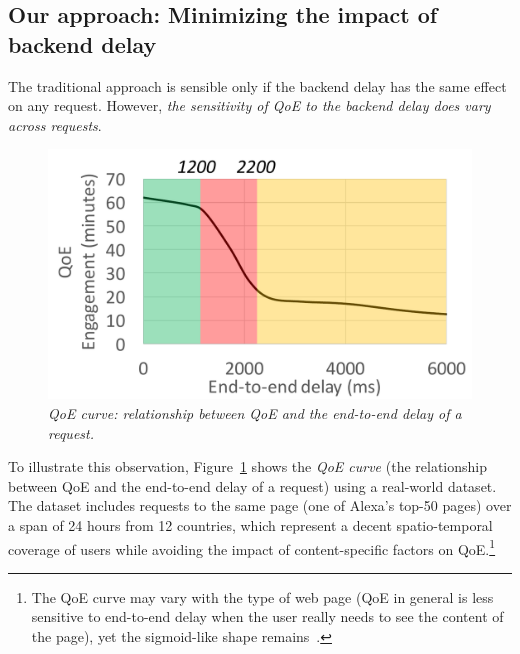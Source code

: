 \subsection{Our approach: Minimizing the impact of backend delay}

The traditional approach is sensible only if the backend delay has the same effect on any request.
However, {\em the sensitivity of QoE to the backend delay does vary across requests}. %

\begin{figure}
	\centering
	\vspace{-0.5cm}
	\includegraphics[width=1.0\textwidth]{figs/qoe-curve.pdf}
	\caption{\em QoE curve: relationship between QoE and the end-to-end delay of a request.}
	\label{fig:qoe-curve}
\end{figure}
To illustrate this observation, Figure~\ref{fig:qoe-curve} shows the {\em QoE curve} (\ie the relationship between QoE and the end-to-end delay of a request) using  a real-world dataset.
The dataset includes requests to the same page (one of Alexa's top-50 pages) over a span of 24 hours from 12 countries, which represent a decent spatio-temporal coverage of users while avoiding the impact of content-specific factors on QoE.\footnote{The QoE curve may vary with the type of web page (\eg QoE in general is less sensitive to end-to-end delay when the user really needs to see the content of the page), yet the sigmoid-like shape remains~\cite{akamai-report}.} 
